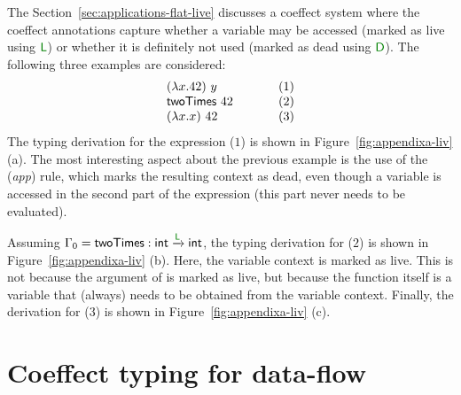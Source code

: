 \newcommand{\vrl}{\cclrd{\ident{L}}}
\newcommand{\vrd}{\cclrd{\ident{D}}}

The Section~\ref{sec:applications-flat-live} discusses a coeffect system where the coeffect 
annotations capture whether a variable may be accessed (marked as live using $\vrl$) or 
whether it is definitely not used (marked as dead using $\vrd$). The following three examples
are considered:
%
\begin{equation*}
\begin{array}{lll}
(\lambda x . 42)~y &~\hspace{1em}~&(1)\\
\textnormal{\sffamily twoTimes}~42          &&(2)\\
(\lambda x . x)~42 &&(3)\\
\end{array}
\end{equation*}
%
The typing derivation for the expression ($1$) is shown in Figure~\ref{fig:appendixa-liv} (a).
The most interesting aspect about the previous example is the use of the (\emph{app}) rule, which
marks the resulting context as dead, even though a variable is accessed in the second part of the
expression (this part never needs to be evaluated). 

Assuming $\Gamma_0 = \ident{twoTimes} : \ident{int} \xrightarrow{\vrl} \ident{int}$,
the typing derivation for ($2$) is shown in Figure~\ref{fig:appendixa-liv} (b).
Here, the variable context is marked as live. This is not because the argument of  
is marked as live, but because the function itself is a variable that (always) needs to be obtained
from the variable context. Finally, the derivation for ($3$) is shown in Figure~\ref{fig:appendixa-liv} (c).


\section{Coeffect typing for data-flow}
\label{sec:appendixa-dataflow}

